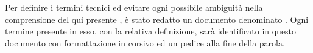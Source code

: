 Per definire i termini tecnici ed evitare ogni possibile ambiguità nella comprensione del qui presente \PdP{}, è stato redatto un documento denominato \Gv{}. Ogni termine presente in esso, con la relativa definizione, sarà identificato in questo documento con formattazione in corsivo ed un pedice \glo{} alla fine della parola.